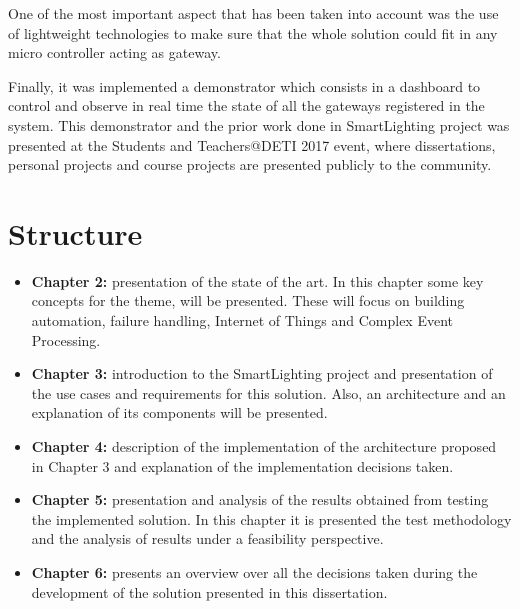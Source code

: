One of the most important aspect that has been taken into account was the use of lightweight technologies to make sure that the whole solution could fit in any micro controller acting as gateway.

Finally, it was implemented a demonstrator which consists in a dashboard to control and observe in real time the state of all the gateways registered in the system. This demonstrator and the prior work done in SmartLighting project was presented at the Students and Teachers@DETI 2017 event, where dissertations, personal projects and course projects are presented publicly to the community.

\section{Structure}

\begin{itemize}

	\item{\textbf{Chapter 2:} presentation of the state of the art. In this chapter some key concepts
		for the theme, will be presented. These will focus on building automation, failure handling, Internet of Things and Complex Event Processing.}
	\item{\textbf{Chapter 3:} introduction to the SmartLighting project and presentation of the use cases and requirements for this solution. Also, an architecture and an explanation of its components will be presented.}
	\item{\textbf{Chapter 4:} description of the implementation of the architecture proposed in Chapter 3 and explanation of the implementation decisions taken.}
	\item{\textbf{Chapter 5:} presentation and analysis of the results obtained from testing the
		implemented solution. In this chapter it is presented the test methodology and the analysis of results under a feasibility perspective.}
	\item{\textbf{Chapter 6:} presents an overview over all the decisions taken during the development of the solution presented in this dissertation.}

\end{itemize}